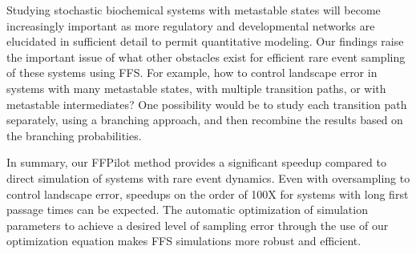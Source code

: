 Studying stochastic biochemical systems with metastable states will become increasingly important as more regulatory and developmental networks are elucidated in sufficient detail to permit quantitative modeling. Our findings raise the important issue of what other obstacles exist for efficient rare event sampling of these systems using FFS. For example, how to control landscape error in systems with many metastable states, with multiple transition paths, or with metastable intermediates? One possibility would be to study each transition path separately, using a branching approach, and then recombine the results based on the branching probabilities.


In summary, our FFPilot method provides a significant speedup compared to direct simulation of systems with rare event dynamics. Even with oversampling to control landscape error, speedups on the order of 100X for systems with long first passage times can be expected. The automatic optimization of simulation parameters to achieve a desired level of sampling error through the use of our optimization equation makes FFS simulations more robust and efficient.


